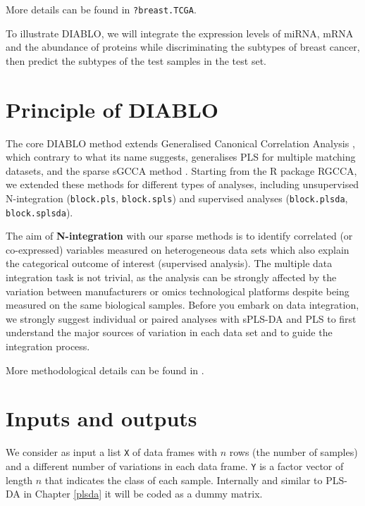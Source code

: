\documentclass[]{book}
\begin{document}
More details can be found in \texttt{?breast.TCGA}.

To illustrate DIABLO, we will integrate the expression levels of miRNA, mRNA and the abundance of proteins while discriminating the subtypes of breast cancer, then predict the subtypes of the test samples in the test set.

\hypertarget{principle-of-diablo}{%
\section{Principle of DIABLO}\label{principle-of-diablo}}

The core DIABLO method extends Generalised Canonical Correlation Analysis \citep{Ten11}, which contrary to what its name suggests, generalises PLS for multiple matching datasets, and the sparse sGCCA method \citep{Ten14}. Starting from the R package RGCCA, we extended these methods for different types of analyses, including unsupervised N-integration (\texttt{block.pls}, \texttt{block.spls}) and supervised analyses (\texttt{block.plsda}, \texttt{block.splsda}).

The aim of \textbf{N-integration} with our sparse methods is to identify correlated (or co-expressed) variables measured on heterogeneous data sets which also explain the categorical outcome of interest (supervised analysis). The multiple data integration task is not trivial, as the analysis can be strongly affected by the variation between manufacturers or omics technological platforms despite being measured on the same biological samples. Before you embark on data integration, we strongly suggest individual or paired analyses with sPLS-DA and PLS to first understand the major sources of variation in each data set and to guide the integration process.

More methodological details can be found in \citep{Sin16}.

\hypertarget{inputs-and-outputs-2}{%
\section{Inputs and outputs}\label{inputs-and-outputs-2}}

We consider as input a list \texttt{X} of data frames with \(n\) rows (the number of samples) and a different number of variations in each data frame. \texttt{Y} is a factor vector of length \(n\) that indicates the class of each sample. Internally and similar to PLS-DA in Chapter \ref{plsda} it will be coded as a dummy matrix.
\end{document}
